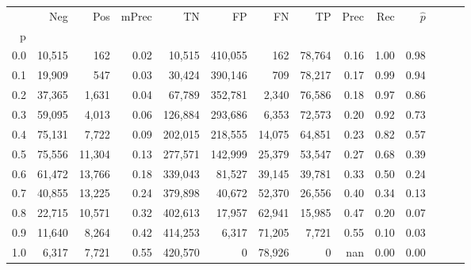 \begin{tabular}{rrrrrrrrrrrrrr}
\toprule
{} &     Neg &     Pos & mPrec &       TN &       FP &      FN &      TP &  Prec &   Rec & $\hat{p}$ \\
p   &         &         &       &          &          &         &         &       &       &           \\
\midrule
0.0 &  10,515 &     162 &  0.02 &   10,515 &  410,055 &     162 &  78,764 &  0.16 &  1.00 &      0.98 \\
0.1 &  19,909 &     547 &  0.03 &   30,424 &  390,146 &     709 &  78,217 &  0.17 &  0.99 &      0.94 \\
0.2 &  37,365 &   1,631 &  0.04 &   67,789 &  352,781 &   2,340 &  76,586 &  0.18 &  0.97 &      0.86 \\
0.3 &  59,095 &   4,013 &  0.06 &  126,884 &  293,686 &   6,353 &  72,573 &  0.20 &  0.92 &      0.73 \\
0.4 &  75,131 &   7,722 &  0.09 &  202,015 &  218,555 &  14,075 &  64,851 &  0.23 &  0.82 &      0.57 \\
0.5 &  75,556 &  11,304 &  0.13 &  277,571 &  142,999 &  25,379 &  53,547 &  0.27 &  0.68 &      0.39 \\
0.6 &  61,472 &  13,766 &  0.18 &  339,043 &   81,527 &  39,145 &  39,781 &  0.33 &  0.50 &      0.24 \\
0.7 &  40,855 &  13,225 &  0.24 &  379,898 &   40,672 &  52,370 &  26,556 &  0.40 &  0.34 &      0.13 \\
0.8 &  22,715 &  10,571 &  0.32 &  402,613 &   17,957 &  62,941 &  15,985 &  0.47 &  0.20 &      0.07 \\
0.9 &  11,640 &   8,264 &  0.42 &  414,253 &    6,317 &  71,205 &   7,721 &  0.55 &  0.10 &      0.03 \\
1.0 &   6,317 &   7,721 &  0.55 &  420,570 &        0 &  78,926 &       0 &   nan &  0.00 &      0.00 \\
\bottomrule
\end{tabular}
